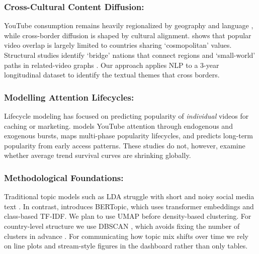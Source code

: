 \documentclass[sigconf,11pt]{acmart}
\begin{document}
\subsubsection{Cross-Cultural Content Diffusion:}
\hspace{1pt} YouTube consumption remains heavily regionalized by geography and language \cite{10.1145/2187836.2187870, 10.1371/journal.pone.0278594}, while cross-border diffusion is shaped by cultural alignment. \cite{10.1371/journal.pone.0177865} shows that popular video overlap is largely limited to countries sharing `cosmopolitan' values. Structural studies identify `bridge' nations that connect regions \cite{Platt2015TheIA} and `small-world' paths in related-video graphs \cite{4539688}. Our approach applies NLP to a 3-year longitudinal dataset \cite{Dataset} to identify the textual themes that cross borders.

\subsubsection{Modelling Attention Lifecycles:}
\hspace{1pt} Lifecycle modeling has focused on predicting popularity of \textit{individual} videos for caching or marketing. \cite{Crane_2008} models YouTube attention through endogenous and exogenous bursts, \cite{Yu_Xie_Sanner_2021} maps multi-phase popularity lifecycles, and \cite{szabo2008predictingpopularityonlinecontent} predicts long-term popularity from early access patterns. These studies do not, however, examine whether average trend survival curves are shrinking globally.

\subsubsection{Methodological Foundations:}
\hspace{1pt} Traditional topic models such as LDA \cite{blei2003latent} struggle with short and noisy social media text \cite{10.1145/1964858.1964870}. In contrast, \cite{grootendorst2022bertopicneuraltopicmodeling} introduces BERTopic, which uses transformer embeddings and class-based TF-IDF. We plan to use UMAP \cite{mcinnes2018umap} before density-based clustering. For country-level structure we use DBSCAN \cite{ester1996density}, which avoids fixing the number of clusters in advance \cite{boik2016empirical}. For communicating how topic mix shifts over time we rely on line plots and stream-style figures in the dashboard rather than only tables.
\end{document}
